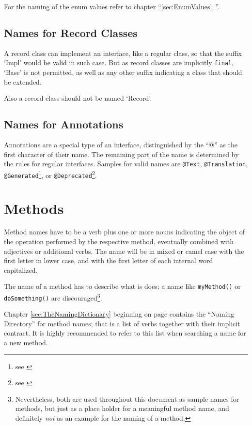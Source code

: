 \documentclass[11pt,a4paper, titlepage, parskip=half, headsepline, footsepline, cleardoublepage=current, headheight=1cm]{scrbook}
\newcommand*{\tqfullref}[1]{\hyperref[{#1}]{“\ref*{#1}~\nameref*{#1}”}}
\newcommand*{\tqref}[1]{\hyperref[{#1}]{\ref*{#1}}}
\begin{document}
For the naming of the enum values refer to chapter \tqfullref{sec:EnumValues}.

\subsection{Names for Record Classes}\label{sec:NamesForRecordClasses}
A record class can implement an interface, like a regular class, so that the suffix ‘Impl’ would be valid in such case. But as record classes are implicitly \lstinline|final|, ‘Base’ is not permitted, as well as any other suffix indicating a class that should be extended.

Also a record class should not be named ‘Record’.

\subsection{Names for Annotations}\label{sec:NamesForAnnotations}
Annotations are a special type of an interface, distinguished by the “@” as the first character of their name. The remaining part of the name is determined by the rules for regular interfaces. Samples for valid names are \lstinline|@Text|, \lstinline|@Translation|, \lstinline|@Generated|\footnote{see \autocite{ORACLE_DOC_GENERATED_ANNOTATION}}, or \lstinline|@Deprecated|\footnote{see \autocite{ORACLE_DOC_DEPRECATED_ANNOTATION}}.

\section{Methods}\label{sec:NamesForMethods}
Method names have to be a verb plus one or more nouns indicating the object of the operation performed by the respective method, eventually combined with adjectives or additional verbs. The name will be in mixed or camel case with the first letter in lower case, and with the first letter of each internal word capitalized.

The name of a method has to describe what is does; a name like \lstinline|myMethod()| or \lstinline|doSomething()| are discouraged\footnote{Nevertheless, both are used throughout this document as sample names for methods, but just as a place holder for a meaningful method name, and definitely \textit{not} as an example for the naming of a method.}.

Chapter \tqref{sec:TheNamingDictionary} beginning on page \pageref{sec:TheNamingDictionary} contains the “Naming Directory” for method names; that is a list of verbs together with their implicit contract. It is highly recommended to refer to this list when searching a name for a new method.
\end{document}
